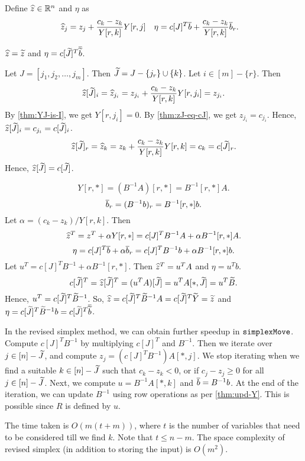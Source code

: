 Define $\widehat{z} \in \mathbb{R}^n$ and $\eta$ as
\begin{align*}
\widehat{z}_j &= z_j + \frac{c_k - z_k}{Y[r,k]} Y[r,j]
& \eta &= c[J]^T\overline{b} + \frac{c_k - z_k}{Y[r, k]}\overline{b}_r.
\end{align*}

\begin{lemma}
\label{thm:upd-z}
$\widehat{z} = \widetilde{z}$ and $\eta = c[\widetilde{J}]^T\overline{\widetilde{b}}$.
\end{lemma}
\begin{longProof}
Let $J = [j_1, j_2, \ldots, j_m]$. Then $\widetilde{J} = J - \{j_r\} \cup \{k\}$.
Let $i \in [m] - \{r\}$. Then
\[ \widehat{z}[\widetilde{J}]_i = \widehat{z}_{j_i} = z_{j_i} + \frac{c_k - z_k}{Y[r,k]} Y[r,j_i] = z_{j_i}. \]
By \cref{thm:YJ-is-I}, we get $Y[r,j_i] = 0$.
By \cref{thm:zJ-eq-cJ}, we get $z_{j_i} = c_{j_i}$.
Hence, $\widehat{z}[\widetilde{J}]_i = c_{j_i} = c[\widetilde{J}]_i$.
\[ \widehat{z}[\widetilde{J}]_r = \widehat{z}_k = z_k + \frac{c_k - z_k}{Y[r,k]} Y[r,k] = c_k = c[\widetilde{J}]_r. \]
Hence, $\widehat{z}[\widetilde{J}] = c[\widetilde{J}]$.

\[ Y[r,*] = (B^{-1}A)[r,*] = B^{-1}[r,*]A. \]
\[ \overline{b}_r = (B^{-1}b)_r = B^{-1}[r,*]b. \]
Let $\alpha = (c_k - z_k)/Y[r,k]$. Then
\[ \widehat{z}^T = z^T + \alpha Y[r,*] = c[J]^TB^{-1}A + \alpha B^{-1}[r,*]A. \]
\[ \eta = c[J]^T\overline{b} + \alpha \overline{b}_r = c[J]^TB^{-1}b + \alpha B^{-1}[r,*]b. \]
Let $u^T = c[J]^TB^{-1} + \alpha B^{-1}[r,*]$. Then $\widehat{z}^T = u^TA$ and $\eta = u^Tb$.
\[ c[\widetilde{J}]^T = \widehat{z}[\widetilde{J}]^T = (u^TA)[\widetilde{J}] = u^TA[*,\widetilde{J}] = u^T\widetilde{B}. \]
Hence, $u^T = c[\widetilde{J}]^T\widetilde{B}^{-1}$.
So, $\widehat{z} = c[\widetilde{J}]^T\widetilde{B}^{-1}A = c[\widetilde{J}]^T\widetilde{Y} = \widetilde{z}$
and $\eta = c[\widetilde{J}]^T\widetilde{B}^{-1}b = c[\widetilde{J}]^T\overline{\widetilde{b}}$.
\end{longProof}

In the revised simplex method, we can obtain further speedup in $\operatorname{\mathtt{simplexMove}}$.
Compute $c[J]^TB^{-1}$ by multiplying $c[J]^T$ and $B^{-1}$.
Then we iterate over $j \in [n] - \widetilde{J}$, and compute $z_j = (c[J]^TB^{-1})A[*,j]$.
We stop iterating when we find a suitable $k \in [n] - \widetilde{J}$ such that $c_k - z_k < 0$,
or if $c_j - z_j \ge 0$ for all $j \in [n] - \widetilde{J}$.
Next, we compute $u = B^{-1}A[*,k]$ and $\overline{b} = B^{-1}b$.
At the end of the iteration, we can update $B^{-1}$ using row operations as per \cref{thm:upd-Y}.
This is possible since $R$ is defined by $u$.

The time taken is $O(m(t+m))$, where $t$ is the number of variables
that need to be considered till we find $k$. Note that $t \le n-m$.
The space complexity of revised simplex (in addition to storing the input) is $O(m^2)$.


